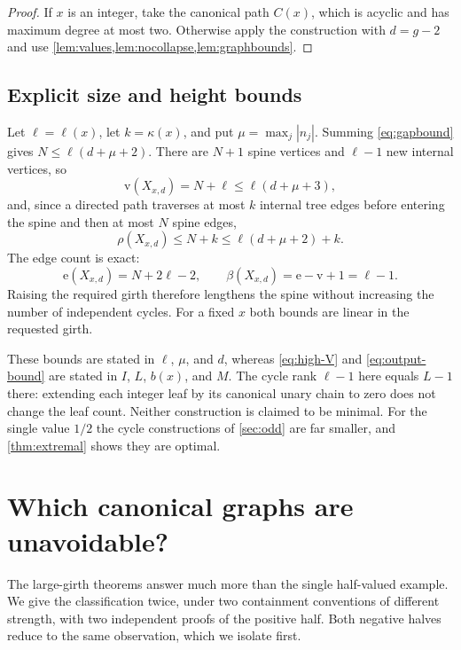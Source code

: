 \documentclass[11pt,a4paper]{article}
\numberwithin{equation}{section}
\theoremstyle{definition}
\theoremstyle{remark}
\newcommand{\rk}{\rho}
\newcommand{\can}{C}
\newcommand{\sizeV}{\mathrm{v}}
\newcommand{\sizeE}{\mathrm{e}}
\begin{document}
\begin{proof}
If $x$ is an integer, take the canonical path $\can(x)$, which is acyclic and
has maximum degree at most two. Otherwise apply the construction with $d=g-2$
and use \cref{lem:values,lem:nocollapse,lem:graphbounds}.
\end{proof}

\subsection{Explicit size and height bounds}

Let $\ell=\ell(x)$, let $k=\kappa(x)$, and put $\mu=\max_j|n_j|$. Summing
\eqref{eq:gapbound} gives $N\leq\ell(d+\mu+2)$. There are $N+1$ spine vertices
and $\ell-1$ new internal vertices, so
\begin{equation}
\label{eq:sizebound}
 \sizeV(X_{x,d})=N+\ell\leq\ell(d+\mu+3),
\end{equation}
and, since a directed path traverses at most $k$ internal tree edges before
entering the spine and then at most $N$ spine edges,
\begin{equation}
\label{eq:heightbound}
 \rk(X_{x,d})\leq N+k\leq\ell(d+\mu+2)+k .
\end{equation}
The edge count is exact:
\begin{equation}
\label{eq:edgecount}
 \sizeE(X_{x,d})=N+2\ell-2,
 \qquad
 \beta(X_{x,d})=\sizeE-\sizeV+1=\ell-1 .
\end{equation}
Raising the required girth therefore lengthens the spine without increasing the
number of independent cycles. For a fixed $x$ both bounds are linear in the
requested girth.

These bounds are stated in $\ell$, $\mu$, and $d$, whereas \eqref{eq:high-V} and
\eqref{eq:output-bound} are stated in $I$, $L$, $b(x)$, and $M$. The cycle rank
$\ell-1$ here equals $L-1$ there: extending each integer leaf by its canonical
unary chain to zero does not change the leaf count. Neither construction is
claimed to be minimal. For the single value $1/2$ the cycle constructions of
\cref{sec:odd} are far smaller, and \cref{thm:extremal} shows they are optimal.

\section{Which canonical graphs are unavoidable?}
\label{sec:classification}

The large-girth theorems answer much more than the single half-valued example.
We give the classification twice, under two containment conventions of different
strength, with two independent proofs of the positive half. Both negative halves
reduce to the same observation, which we isolate first.
\end{document}
